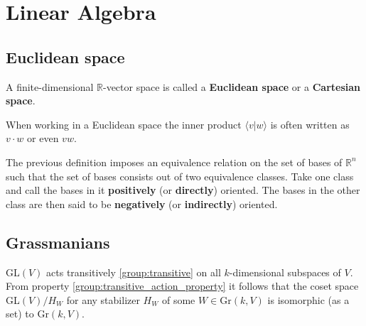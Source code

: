 \chapter{Linear Algebra}\label{chapter:linear_algebra}






\section{Euclidean space}

    A finite-dimensional $\mathbb{R}$-vector space is called a \textbf{Euclidean space} or a \textbf{Cartesian space}.

    \begin{notation}
        When working in a Euclidean space the inner product $\langle v|w\rangle$ is often written as $v\cdot w$ or even $vw$.
    \end{notation}

    \begin{result}
        The previous definition imposes an equivalence relation on the set of bases of $\mathbb{R}^n$ such that the set of bases consists out of two equivalence classes. Take one class and call the bases in it \textbf{positively} (or \textbf{directly}) oriented. The bases in the other class are then said to be \textbf{negatively} (or \textbf{indirectly}) oriented.
    \end{result}

\section{Grassmanians}

    \begin{property}\label{linalgebra:grassmannian_construction}
        GL$(V)$ acts transitively \ref{group:transitive} on all $k$-dimensional subspaces of $V$. From property \ref{group:transitive_action_property} it follows that the coset space GL$(V)/H_W$ for any stabilizer $H_W$ of some $W\in \text{Gr}(k, V)$ is isomorphic (as a set) to $\text{Gr}(k, V)$.
    \end{property}

